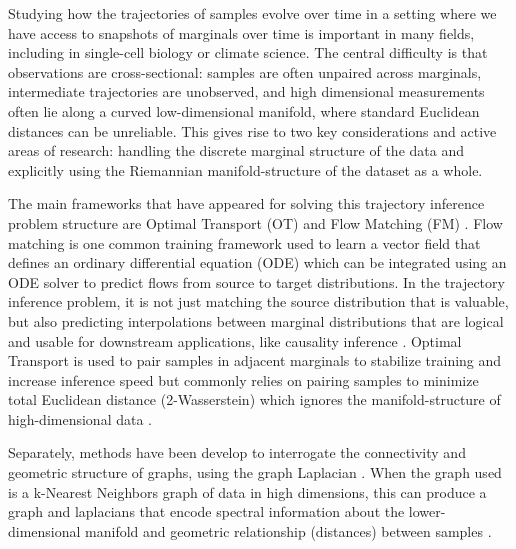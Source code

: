 Studying how the trajectories of samples evolve over time in a setting where we have access to snapshots of marginals over time is important in many fields, including in single-cell biology or climate science. The central difficulty is that observations are cross-sectional: samples are often unpaired across marginals, intermediate trajectories are unobserved, and high dimensional measurements often lie along a curved low-dimensional manifold, where standard Euclidean distances can be unreliable. This gives rise to two key considerations and active areas of research: handling the discrete marginal structure of the data and explicitly using the Riemannian manifold-structure of the dataset as a whole.

The main frameworks that have appeared for solving this trajectory inference problem structure are Optimal Transport (OT) and Flow Matching (FM) \cite{lipmanFlowMatchingGenerative2023, liuRectifiedFlowFlow2022}. Flow matching is one common training framework used to learn a vector field that defines an ordinary differential equation (ODE) which can be integrated using an ODE solver to predict flows from source to target distributions. In the trajectory inference problem, it is not just matching the source distribution that is valuable, but also predicting interpolations between marginal distributions that are logical and usable for downstream applications, like causality inference \cite{sunCFlowsRevealingDynamic}. Optimal Transport is used to pair samples in adjacent marginals to stabilize training and increase inference speed but commonly relies on pairing samples to minimize total Euclidean distance (2-Wasserstein) which ignores the manifold-structure of high-dimensional data \cite{tongImprovingGeneralizingFlowbased2024}.

Separately, methods have been develop to interrogate the connectivity and geometric structure of graphs, using the graph Laplacian \cite{belkinLaplacianEigenmapsDimensionality2003}. When the graph used is a k-Nearest Neighbors graph of data in high dimensions, this can produce a graph and laplacians that encode spectral information about the lower-dimensional manifold and geometric relationship (distances) between samples \cite{lipmanBiharmonicDistance2010, moonPHATEVisualizingStructure2019}.

